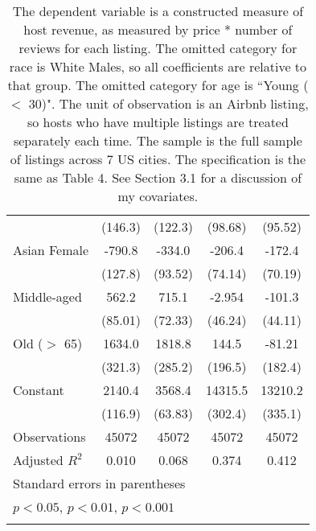{\begin{longtable}{l*{4}{c}}
                    &     (146.3)         &     (122.3)         &     (98.68)         &     (95.52)         \\
[1em]
Asian Female        &      -790.8\sym{***}&      -334.0\sym{***}&      -206.4\sym{**} &      -172.4\sym{*}  \\
                    &     (127.8)         &     (93.52)         &     (74.14)         &     (70.19)         \\
[1em]
Middle-aged         &       562.2\sym{***}&       715.1\sym{***}&      -2.954         &      -101.3\sym{*}  \\
                    &     (85.01)         &     (72.33)         &     (46.24)         &     (44.11)         \\
[1em]
Old ($>$ 65)           &      1634.0\sym{***}&      1818.8\sym{***}&       144.5         &      -81.21         \\
                    &     (321.3)         &     (285.2)         &     (196.5)         &     (182.4)         \\
[1em]
Constant            &      2140.4\sym{***}&      3568.4\sym{***}&     14315.5\sym{***}&     13210.2\sym{***}\\
                    &     (116.9)         &     (63.83)         &     (302.4)         &     (335.1)         \\
\hline
Observations        &       45072         &       45072         &       45072         &       45072         \\
Adjusted \(R^{2}\)  &       0.010         &       0.068         &       0.374         &       0.412         \\
\hline\hline
\multicolumn{5}{l}{\footnotesize Standard errors in parentheses}\\
\multicolumn{5}{l}{\footnotesize \sym{*} \(p<0.05\), \sym{**} \(p<0.01\), \sym{***} \(p<0.001\)}\\
\caption*{The dependent variable is a constructed measure of host revenue, as measured by price * number of reviews for each listing. The omitted category for race is White Males, so all coefficients are relative to that group. The omitted category for age is ``Young ($<$ 30)". The unit of observation is an Airbnb listing, so hosts who have multiple listings are treated separately each time. The sample is the full sample of listings across 7 US cities. The specification is the same as Table 4. See Section 3.1 for a discussion of my covariates.}

\end{longtable}
}

